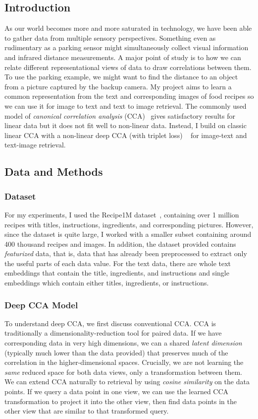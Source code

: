 \documentclass[12pt, titlepage]{article}
\begin{document}
\subsection{Introduction}
As our world becomes more and more saturated in technology, we have been able to gather data from multiple sensory perspectives. Something even as rudimentary as a parking sensor might simultaneously collect visual information and infrared distance measurements. A major point of study is to how we can relate different representational views of data to draw correlations between them. To use the parking example, we might want to find the distance to an object from a picture captured by the backup camera. My project aims to learn a common representation from the text and corresponding images of food recipes so we can use it for image to text and text to image retrieval. The commonly used model of \textit{canonical correlation analysis} (CCA)~\cite{HardoonSS04} gives satisfactory results for linear data but it does not fit well to non-linear data. Instead, I build on classic linear CCA with a non-linear deep CCA (with triplet loss) ~\cite{CCATripletLoss,GuerreroPP21} for image-text and text-image retrieval.

\subsection{Data and Methods}
\subsubsection{Dataset}
For my experiments, I used the Recipe1M dataset~\cite{Recipe1M}, containing over 1 million recipes with titles, instructions, ingredients, and corresponding pictures. However, since the dataset is quite large, I worked with a smaller subset containing around 400 thousand recipes and images. In addition, the dataset provided contains \textit{featurized} data, that is, data that has already been preprocessed to extract only the useful parts of each data value. For the text data, there are whole text embeddings that contain the title, ingredients, and instructions and single embeddings which contain either titles, ingredients, or instructions.

\subsubsection{Deep CCA Model}
To understand deep CCA, we first discuss conventional CCA. CCA is traditionally a dimensionality-reduction tool for paired data. If we have corresponding data in very high dimensions, we can  a shared \textit{latent dimension} (typically much lower than the data provided) that preserves much of the correlation in the higher-dimensional spaces. Crucially, we are not learning the \textit{same} reduced space for both data views, only a transformation between them. We can extend CCA naturally to retrieval by using \textit{cosine similarity} on the data points. If we query a data point in one view, we can use the learned CCA transformation to project it into the other view, then find data points in the other view that are similar to that transformed query.
\end{document}
